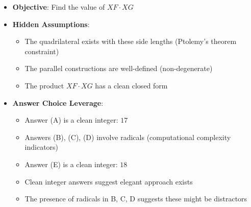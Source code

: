 \documentclass[]{article}
\begin{document}
\begin{problemconfigbox}
\begin{itemize}[leftmargin=*]
    \item \textbf{Objective}: Find the value of $XF \cdot XG$
    
    \item \textbf{Hidden Assumptions}:
    \begin{itemize}
        \item The quadrilateral exists with these side lengths (Ptolemy's theorem constraint)
        \item The parallel constructions are well-defined (non-degenerate)
        \item The product $XF \cdot XG$ has a clean closed form
    \end{itemize}
    
    \item \textbf{Answer Choice Leverage}:
    \begin{itemize}
        \item Answer (A) is a clean integer: $17$
        \item Answers (B), (C), (D) involve radicals (computational complexity indicators)
        \item Answer (E) is a clean integer: $18$
        \item Clean integer answers suggest elegant approach exists
        \item The presence of radicals in B, C, D suggests these might be distractors
    \end{itemize}
\end{itemize}


\end{problemconfigbox}
\end{document}
